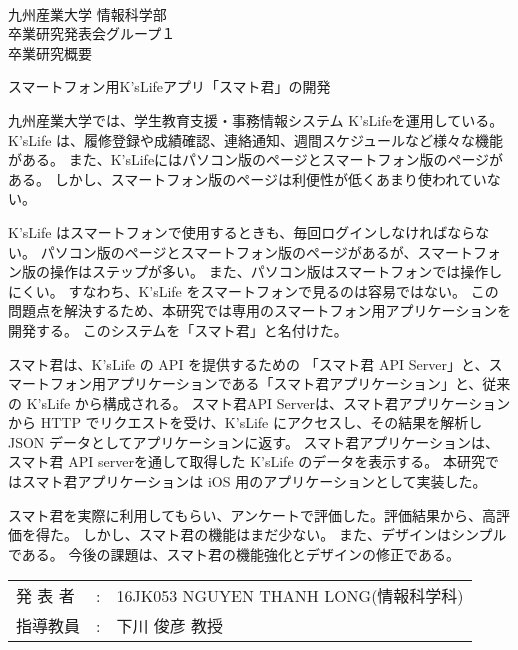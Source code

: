 \documentclass[a4j,12pt]{jarticle}
\title
\renewcommand{\author}[1]{\def\author{#1}}
\renewcommand{\title}[1]{\def\title{#1}}
\newcommand{\supervisor}[1]{\def\supervisor{#1}}
\newcommand{\group}[1]{\def\group{#1}}
\newcommand{\makeheader}{
\newpage
\noindent\\九州産業大学 情報科学部
\noindent\\卒業研究発表会グループ\group
\noindent\\卒業研究概要
\vskip 20mm
\begin{center}
  \title
\end{center}
\vskip 15mm
}
\newcommand{\maketailer}{
\vskip 20mm
\begin{center}
\setlength{\tabcolsep}{1mm}
\begin{tabular}[h]{p{4zw}p{1em}l}
 発 表 者&:& \author (情報科学科)\\
 指導教員&:& \supervisor
\end{tabular}
\end{center}
}
\newenvironment{jkabst}{\makeheader}{\maketailer}
\begin{document}
\title{スマートフォン用K'sLifeアプリ「スマト君」の開発}
\author{16JK053 NGUYEN THANH LONG}
\supervisor{下川 俊彦 教授}
\group{１}

\begin{jkabst}

  九州産業大学では、学生教育支援・事務情報システム K'sLifeを運用している。
  K'sLife は、履修登録や成績確認、連絡通知、週間スケジュールなど様々な機能がある。
  また、K'sLifeにはパソコン版のページとスマートフォン版のページがある。
  しかし、スマートフォン版のページは利便性が低くあまり使われていない。

  K'sLife はスマートフォンで使用するときも、毎回ログインしなければならない。
  パソコン版のページとスマートフォン版のページがあるが、スマートフォン版の操作はステップが多い。
  また、パソコン版はスマートフォンでは操作しにくい。
  すなわち、K'sLife をスマートフォンで見るのは容易ではない。
  この問題点を解決するため、本研究では専用のスマートフォン用アプリケーションを開発する。
  このシステムを「スマト君」と名付けた。

  スマト君は、K'sLife の API を提供するための 「スマト君 API Server」と、スマートフォン用アプリケーションである「スマト君アプリケーション」と、従来の K'sLife から構成される。
  スマト君API Serverは、スマト君アプリケーションから HTTP でリクエストを受け、K'sLife にアクセスし、その結果を解析し JSON データとしてアプリケーションに返す。
  スマト君アプリケーションは、スマト君 API serverを通して取得した K'sLife のデータを表示する。
  本研究ではスマト君アプリケーションは iOS 用のアプリケーションとして実装した。

  スマト君を実際に利用してもらい、アンケートで評価した。評価結果から、高評価を得た。
  しかし、スマト君の機能はまだ少ない。
  また、デザインはシンプルである。
  今後の課題は、スマト君の機能強化とデザインの修正である。


\end{jkabst}
\end{document}
